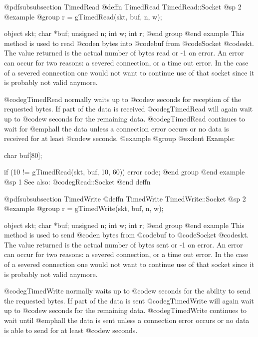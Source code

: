 @pdfsubsubsection {TimedRead}
@deffn {TimedRead} TimedRead::Socket
@sp 2
@example
@group
r = gTimedRead(skt, buf, n, w);

object   skt;
char     *buf;
unsigned n;
int      w;
int      r;
@end group
@end example
This method is used to read @code{n} bytes into @code{buf} from
@code{Socket} @code{skt}.  The value returned is the actual number
of bytes read or -1 on error.  An error can occur for two reasons:
a severed connection, or a time out error.  In the case of a severed
connection one would not want to continue use of that socket since
it is probably not valid anymore.

@code{gTimedRead} normally waits up to @code{w} seconds for reception of the
requested bytes.  If part of the data is received @code{gTimedRead}
will again wait up to @code{w} seconds for the remaining data.  @code{gTimedRead}
continues to wait for @emph{all} the data unless a connection error
occurs or no data is received for at least @code{w} seconds.
@example
@group
@exdent Example:
 
char    buf[80];

if (10 != gTimedRead(skt, buf, 10, 60))
        error code;
@end group
@end example
@sp 1
See also:  @code{gRead::Socket}
@end deffn



















@pdfsubsubsection {TimedWrite}
@deffn {TimedWrite} TimedWrite::Socket
@sp 2
@example
@group
r = gTimedWrite(skt, buf, n, w);

object   skt;
char     *buf;
unsigned n;
int      w;
int      r;
@end group
@end example
This method is used to send @code{n} bytes from @code{buf} to
@code{Socket} @code{skt}.  The value returned is the actual number
of bytes sent or -1 on error.  An error can occur for two reasons:
a severed connection, or a time out error.  In the case of a severed
connection one would not want to continue use of that socket since
it is probably not valid anymore.

@code{gTimedWrite} normally waits up to @code{w} seconds for the ability to send the
requested bytes.  If part of the data is sent @code{gTimedWrite} will again
wait up to @code{w} seconds for the remaining data.  @code{gTimedWrite} continues to
wait until @emph{all} the data is sent unless a connection error occurs
or no data is able to send for at least @code{w} seconds.

